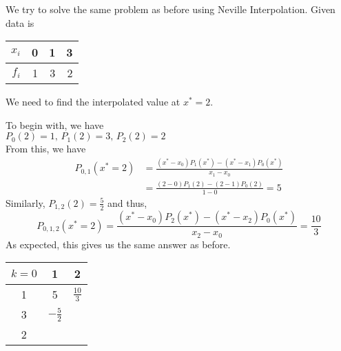 \begin{example}
    We try to solve the same problem as before using Neville Interpolation. Given data is
    \begin{center}
        \begin{tabular}{|r||r|r|r|}
            \hline
            $x_i$ & 0 & 1 & 3 \\
            \hline
            $f_i$ & 1 & 3 & 2 \\
            \hline
        \end{tabular}
    \end{center}
    We need to find the interpolated value at $x^* = 2$.
\end{example}

\begin{soln}
    To begin with, we have\\
    $P_0(2) = 1 \text{, } P_1(2) = 3 \text{, } P_2(2) = 2$\\
    From this, we have
    \begin{equation}
        \begin{split}
            P_{0,1}(x^*=2) &= \frac{(x^*-x_0)P_1(x^*)-(x^*-x_1)P_0(x^*)}{x_1 - x_0} \\
            &= \frac{(2-0)P_1(2)-(2-1)P_0(2)}{1 - 0} = 5
        \end{split}
    \end{equation}
    Similarly, $P_{1,2}(2) = \frac{5}{2}$ and thus,
    $$P_{0,1,2}(x^* = 2) = \frac{(x^*-x_0)P_2(x^*)-(x^*-x_2)P_0(x^*)}{x_2 - x_0} = \frac{10}{3}$$
    As expected, this gives us the same answer as before.

    \begin{center}
        \begin{tabular}{|ccc|}
             \hline
             $k = 0$& 1 & 2\\
             \hline
             1& 5 & $\frac{10}{3}$ \\
             3 & $-\frac{5}{2}$ & \\
             2 &  & \\
             
             \hline
         \end{tabular}
     \end{center}
\end{soln}